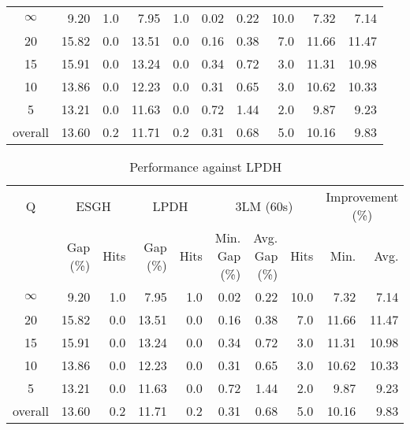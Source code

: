 \begin{table}[H]
\begin{tabular}{c rr rr rrr rr}
\midrule
$\infty$ &     9.20 &  1.0 &     7.95 &  1.0 &          0.02 &          0.22 & 10.0 &             7.32 &  7.14 \\
      20 &    15.82 &  0.0 &    13.51 &  0.0 &          0.16 &          0.38 &  7.0 &            11.66 & 11.47 \\
      15 &    15.91 &  0.0 &    13.24 &  0.0 &          0.34 &          0.72 &  3.0 &            11.31 & 10.98 \\
      10 &    13.86 &  0.0 &    12.23 &  0.0 &          0.31 &          0.65 &  3.0 &            10.62 & 10.33 \\
       5 &    13.21 &  0.0 &    11.63 &  0.0 &          0.72 &          1.44 &  2.0 &             9.87 &  9.23 \\
\midrule
 overall &    13.60 &  0.2 &    11.71 &  0.2 &          0.31 &          0.68 &  5.0 &            10.16 &  9.83 \\
\bottomrule
\end{tabular}
\end{table}\begin{table}[H]
\centering
\caption{Performance against LPDH}
\label{tab:3lm_resuts_kritikos2}
\begin{tabular}{c rr rr rrr rr}
\toprule
       Q & \multicolumn{2}{c}{ESGH} & \multicolumn{2}{c}{LPDH} & \multicolumn{3}{c}{3LM (60s)} & \multicolumn{2}{c}{Improvement (\%)} \\
         & Gap (\%) & Hits & Gap (\%) & Hits & Min. Gap (\%) & Avg. Gap (\%) & Hits &             Min. &  Avg. \\
\midrule
$\infty$ &     9.20 &  1.0 &     7.95 &  1.0 &          0.02 &          0.22 & 10.0 &             7.32 &  7.14 \\
      20 &    15.82 &  0.0 &    13.51 &  0.0 &          0.16 &          0.38 &  7.0 &            11.66 & 11.47 \\
      15 &    15.91 &  0.0 &    13.24 &  0.0 &          0.34 &          0.72 &  3.0 &            11.31 & 10.98 \\
      10 &    13.86 &  0.0 &    12.23 &  0.0 &          0.31 &          0.65 &  3.0 &            10.62 & 10.33 \\
       5 &    13.21 &  0.0 &    11.63 &  0.0 &          0.72 &          1.44 &  2.0 &             9.87 &  9.23 \\
\midrule
 overall &    13.60 &  0.2 &    11.71 &  0.2 &          0.31 &          0.68 &  5.0 &            10.16 &  9.83 \\
\bottomrule
\end{tabular}

\end{table}

